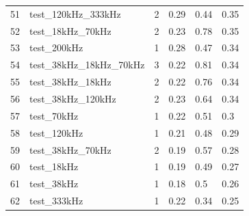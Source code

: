 \begin{longtable}{llllll}
51                     & test\_120kHz\_333kHz                              & 2                        & 0.29                           & 0.44                        & 0.35                           \\
52                     & test\_18kHz\_70kHz                                & 2                        & 0.23                           & 0.78                        & 0.35                           \\
53                     & test\_200kHz                                      & 1                        & 0.28                           & 0.47                        & 0.34                           \\
54                     & test\_38kHz\_18kHz\_70kHz                         & 3                        & 0.22                           & 0.81                        & 0.34                           \\
55                     & test\_38kHz\_18kHz                                & 2                        & 0.22                           & 0.76                        & 0.34                           \\
56                     & test\_38kHz\_120kHz                               & 2                        & 0.23                           & 0.64                        & 0.34                           \\
57                     & test\_70kHz                                       & 1                        & 0.22                           & 0.51                        & 0.3                            \\
58                     & test\_120kHz                                      & 1                        & 0.21                           & 0.48                        & 0.29                           \\
59                     & test\_38kHz\_70kHz                                & 2                        & 0.19                           & 0.57                        & 0.28                           \\
60                     & test\_18kHz                                       & 1                        & 0.19                           & 0.49                        & 0.27                           \\
61                     & test\_38kHz                                       & 1                        & 0.18                           & 0.5                         & 0.26                           \\
62                     & test\_333kHz                                      & 1                        & 0.22                           & 0.34                        & 0.25                           \\ \hline
\end{longtable}


